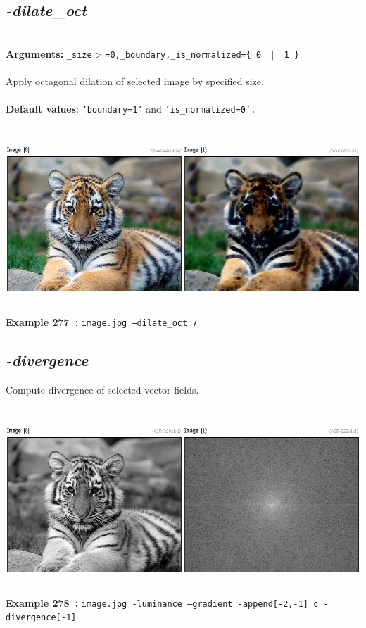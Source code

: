 \documentclass[a4paper,11pt,twoside]{book}
\begin{document}
\subsection{\emph{-dilate\_oct} }\vspace*{-0.5em}
~\\\textbf{Arguments: } 
{\small \texttt{\_size$>$=0,\_boundary,\_is\_normalized=\{ 0 ~$|$~ 1 \}}}\\~\\
Apply octagonal dilation of selected image by specified size.
~\\~\\\textbf{Default values}: {\small \texttt{'boundary=1'} and \texttt{'is\_normalized=0'.}}
\begin{center}\includegraphics[keepaspectratio=true,height=7cm,width=\textwidth]{img/gmic_def277.jpg}\\
{\footnotesize \textbf{Example 277~:} \texttt{image.jpg --dilate\_oct 7}}
\end{center}

\subsection{\emph{-divergence} }\vspace*{-0.5em}
Compute divergence of selected vector fields.
\begin{center}\includegraphics[keepaspectratio=true,height=7cm,width=\textwidth]{img/gmic_def278.jpg}\\
{\footnotesize \textbf{Example 278~:} \texttt{image.jpg -luminance --gradient -append[-2,-1] c -divergence[-1]}}
\end{center}
\end{document}
